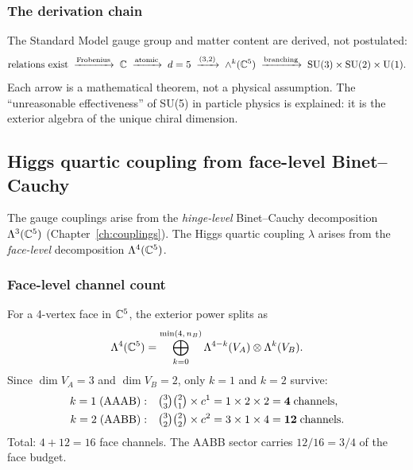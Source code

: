 \subsubsection{The derivation chain}

The Standard Model gauge group and matter content are derived, not postulated:
\begin{equation}
\text{relations exist} \;\xrightarrow{\text{Frobenius}}\; \mathbb{C} \;\xrightarrow{\text{atomic}}\; d = 5 \;\xrightarrow{(3,2)}\; \wedge^k(\mathbb{C}^5) \;\xrightarrow{\text{branching}}\; \text{SU}(3) \times \text{SU}(2) \times \text{U}(1).
\end{equation}
Each arrow is a mathematical theorem, not a physical assumption.  The ``unreasonable effectiveness'' of SU(5) in particle physics is explained: it is the exterior algebra of the unique chiral dimension.

\subsection{Higgs quartic coupling from face-level Binet--Cauchy}
\label{sec:higgs_quartic}

The gauge couplings arise from the \emph{hinge-level} Binet--Cauchy decomposition $\Lambda^3(\mathbb{C}^5)$ (Chapter~\ref{ch:couplings}).  The Higgs quartic coupling $\lambda$ arises from the \emph{face-level} decomposition $\Lambda^4(\mathbb{C}^5)$.

\subsubsection{Face-level channel count}

For a 4-vertex face in $\mathbb{C}^5$, the exterior power splits as
\begin{equation}
\Lambda^4(\mathbb{C}^5) = \bigoplus_{k=0}^{\min(4,\,n_B)} \Lambda^{4-k}(V_A) \otimes \Lambda^k(V_B).
\end{equation}
Since $\dim V_A = 3$ and $\dim V_B = 2$, only $k = 1$ and $k = 2$ survive:
\begin{align}
k = 1\;(\text{AAAB}):&\quad \tbinom{3}{3}\tbinom{2}{1}\times c^1 = 1 \times 2 \times 2 = \mathbf{4}\;\text{channels}, \\
k = 2\;(\text{AABB}):&\quad \tbinom{3}{2}\tbinom{2}{2}\times c^2 = 3 \times 1 \times 4 = \mathbf{12}\;\text{channels}.
\end{align}
Total: $4 + 12 = 16$ face channels.  The AABB sector carries $12/16 = 3/4$ of the face budget.

